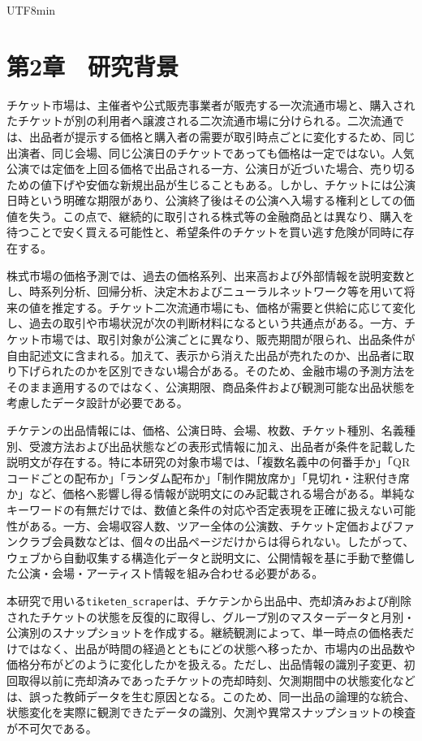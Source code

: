 \documentclass[a4paper,12pt]{report}
\begin{document}
\begin{CJK}{UTF8}{min}
\chapter*{第2章　研究背景}

チケット市場は、主催者や公式販売事業者が販売する一次流通市場と、購入されたチケットが別の利用者へ譲渡される二次流通市場に分けられる。二次流通では、出品者が提示する価格と購入者の需要が取引時点ごとに変化するため、同じ出演者、同じ会場、同じ公演日のチケットであっても価格は一定ではない。人気公演では定価を上回る価格で出品される一方、公演日が近づいた場合、売り切るための値下げや安価な新規出品が生じることもある。しかし、チケットには公演日時という明確な期限があり、公演終了後はその公演へ入場する権利としての価値を失う。この点で、継続的に取引される株式等の金融商品とは異なり、購入を待つことで安く買える可能性と、希望条件のチケットを買い逃す危険が同時に存在する。

株式市場の価格予測では、過去の価格系列、出来高および外部情報を説明変数とし、時系列分析、回帰分析、決定木およびニューラルネットワーク等を用いて将来の値を推定する。チケット二次流通市場にも、価格が需要と供給に応じて変化し、過去の取引や市場状況が次の判断材料になるという共通点がある。一方、チケット市場では、取引対象が公演ごとに異なり、販売期間が限られ、出品条件が自由記述文に含まれる。加えて、表示から消えた出品が売れたのか、出品者に取り下げられたのかを区別できない場合がある。そのため、金融市場の予測方法をそのまま適用するのではなく、公演期限、商品条件および観測可能な出品状態を考慮したデータ設計が必要である。

チケテンの出品情報には、価格、公演日時、会場、枚数、チケット種別、名義種別、受渡方法および出品状態などの表形式情報に加え、出品者が条件を記載した説明文が存在する。特に本研究の対象市場では、「複数名義中の何番手か」「QRコードごとの配布か」「ランダム配布か」「制作開放席か」「見切れ・注釈付き席か」など、価格へ影響し得る情報が説明文にのみ記載される場合がある。単純なキーワードの有無だけでは、数値と条件の対応や否定表現を正確に扱えない可能性がある。一方、会場収容人数、ツアー全体の公演数、チケット定価およびファンクラブ会員数などは、個々の出品ページだけからは得られない。したがって、ウェブから自動収集する構造化データと説明文に、公開情報を基に手動で整備した公演・会場・アーティスト情報を組み合わせる必要がある。

本研究で用いる\texttt{tiketen\_scraper}は、チケテンから出品中、売却済みおよび削除されたチケットの状態を反復的に取得し、グループ別のマスターデータと月別・公演別のスナップショットを作成する。継続観測によって、単一時点の価格表だけではなく、出品が時間の経過とともにどの状態へ移ったか、市場内の出品数や価格分布がどのように変化したかを扱える。ただし、出品情報の識別子変更、初回取得以前に売却済みであったチケットの売却時刻、欠測期間中の状態変化などは、誤った教師データを生む原因となる。このため、同一出品の論理的な統合、状態変化を実際に観測できたデータの識別、欠測や異常スナップショットの検査が不可欠である。


\end{CJK}
\end{document}

